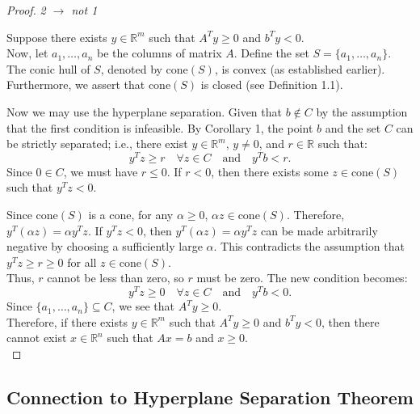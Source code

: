\documentclass[11pt]{amsart} %
\theoremstyle{definition}
\begin{document}
\begin{proof} \textit{2 \(\xrightarrow{}\) not 1}

Suppose there exists \( y \in \mathbb{R}^m \) such that \( A^T y \geq 0 \) and \( b^T y < 0 \).\\

Now, let \( a_1, \ldots, a_n \) be the columns of matrix \( A \). Define the set \( S = \{a_1, \ldots, a_n\} \). The conic hull of \( S \), denoted by \(\text{cone}(S)\), is convex (as established earlier). Furthermore, we assert that \(\text{cone}(S)\) is closed (see Definition 1.1). 

Now we may use the hyperplane separation. Given that \( b \notin C \) by the assumption that the first condition is infeasible. By Corollary 1, the point \( b \) and the set \( C \) can be strictly separated; i.e., there exist \( y \in \mathbb{R}^m \), \( y \neq 0 \), and \( r \in \mathbb{R} \) such that:
\[
y^T z \geq r \quad \forall z \in C \quad \text{and} \quad y^T b < r.
\]
Since \( 0 \in C \), we must have \( r \leq 0 \). If \( r < 0 \), then there exists some \( z \in \text{cone}(S) \) such that \( y^T z < 0 \). 

Since \( \text{cone}(S) \) is a cone, for any \(\alpha \geq 0\), \(\alpha z \in \text{cone}(S)\). Therefore, \( y^T (\alpha z) = \alpha y^T z \). If \( y^T z < 0 \), then \( y^T (\alpha z) = \alpha y^T z \) can be made arbitrarily negative by choosing a sufficiently large \(\alpha\). This contradicts the assumption that \( y^T z \geq r \geq 0 \) for all \( z \in \text{cone}(S) \).\\

Thus, \( r \) cannot be less than zero, so \( r \) must be zero. The new condition becomes:
\[
y^T z \geq 0 \quad \forall z \in C \quad \text{and} \quad y^T b < 0.
\]
Since \( \{a_1, \ldots, a_n\} \subseteq C \), we see that \( A^T y \geq 0 \).\\

Therefore, if there exists \( y \in \mathbb{R}^m \) such that \( A^T y \geq 0 \) and \( b^T y < 0 \), then there cannot exist \( x \in \mathbb{R}^n \) such that \( Ax = b \) and \( x \geq 0 \).\\

\end{proof}

\subsection{Connection to Hyperplane Separation Theorem}
\end{document}
